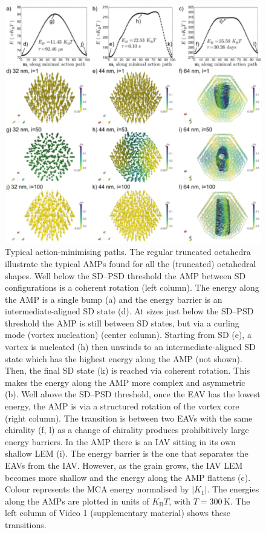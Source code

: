 \documentclass[review,authoryear]{elsarticle}
\begin{document}
\begin{figure}[ht]
\centering
\includegraphics[width=\textwidth]{Figure_07.pdf}
\caption{Typical action-minimising paths. The regular truncated octahedra illustrate the typical AMPs found for all the (truncated) octahedral shapes. Well below the SD--PSD threshold the AMP between SD configurations is a coherent rotation (left column). The energy along the AMP is a single bump (a) and the energy barrier is an intermediate-aligned SD state (d). At sizes just below the SD--PSD threshold the AMP is still between SD states, but via a curling mode (vortex nucleation) (center column). Starting from SD (e), a vortex is nucleated (h) then unwinds to an intermediate-aligned SD state which has the highest energy along the AMP (not shown). Then, the final SD state (k) is reached via coherent rotation. This makes the energy along the AMP more complex and asymmetric (b). Well above the SD--PSD threshold, once the EAV has the lowest energy, the AMP is via a structured rotation of the vortex core (right column). The transition is between two EAVs with the same chirality (f, l) as a change of chirality produces prohibitively large energy barriers. In the AMP there is an IAV sitting in its own shallow LEM (i). The energy barrier is the one that separates the EAVs from the IAV. However, as the grain grows, the IAV LEM becomes more shallow and the energy along the AMP flattens (c). Colour represents the MCA energy normalised by $|K_1|$. The energies along the AMPs are plotted in units of $K_\text{B}T$, with $T=300\,\text{K}$. The left column of Video 1 (supplementary material) shows these transitions.}
\label{fig7}
\end{figure}
\end{document}

